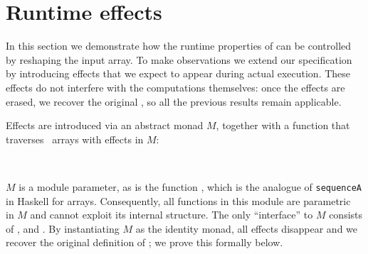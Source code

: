 \section{Runtime effects\label{sec:runtime}}
In this section we demonstrate how the runtime properties of  can be
controlled by reshaping the input array.  To make observations we extend our
specification by introducing effects that we expect to appear during actual
execution.  These effects do not interfere with the computations themselves:
once the effects are erased, we recover the original , so all the
previous results remain applicable.

Effects are introduced via an abstract monad $M$, together with a function
 that traverses~\citep{MCBRIDE_PATERSON_2008} arrays with effects
in $M$:
\begin{code}%
\>[0]\AgdaSpace{}%
%
\>[48I]\AgdaSymbol{(}\AgdaSpace{}%
\AgdaSymbol{:}\AgdaSpace{}%
\AgdaSpace{}%
\AgdaSpace{}%
\AgdaSymbol{)}\AgdaSpace{}%
\AgdaSymbol{(}\AgdaSpace{}%
\AgdaSymbol{:}\AgdaSpace{}%
\AgdaSpace{}%
\AgdaSymbol{)}\<%
\\
\>[.][@{}l@{}]\<[48I]%
\>[17]\AgdaSymbol{(}\AgdaSpace{}%
\AgdaSymbol{:}\AgdaSpace{}%
\AgdaSpace{}%
\AgdaSymbol{\{}\AgdaSpace{}%
\AgdaSymbol{\}}\AgdaSpace{}%
\AgdaSpace{}%
\AgdaSpace{}%
\AgdaSpace{}%
\AgdaSymbol{(}\AgdaSpace{}%
\AgdaSymbol{)}\AgdaSpace{}%
\AgdaSpace{}%
\AgdaSpace{}%
\AgdaSymbol{(}\AgdaSpace{}%
\AgdaSpace{}%
\AgdaSymbol{))}\AgdaSpace{}%
\<%
\end{code}
$M$ is a module parameter, as is the function , which is the analogue
of \texttt{sequenceA} in Haskell for arrays.  Consequently, all
functions in this module are parametric~\citep{reynolds1983types} in $M$ and
cannot exploit its internal structure.  The only ``interface'' to $M$ consists
of , \AF{\_>>=\_} and .  By instantiating $M$ as the
identity monad, all effects disappear and we recover the original definition of
; we prove this formally below.
